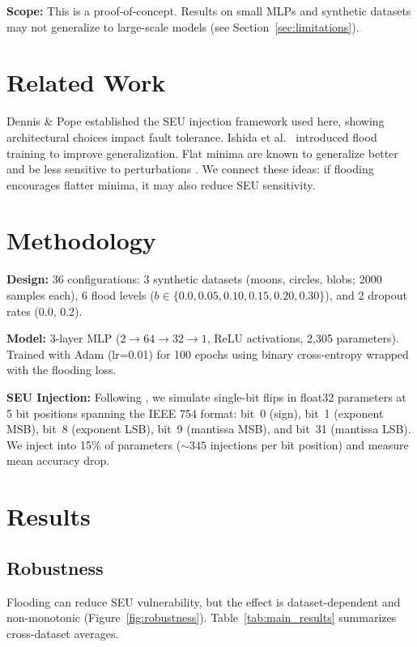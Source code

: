 \documentclass{article}
\begin{document}
\textbf{Scope:} This is a proof-of-concept. Results on small MLPs and synthetic datasets may not generalize to large-scale models (see Section~\ref{sec:limitations}).

\section{Related Work}

Dennis \& Pope \cite{dennis2025framework} established the SEU injection framework used here, showing architectural choices impact fault tolerance. Ishida et al.\ \cite{ishida2020we} introduced flood training to improve generalization. Flat minima are known to generalize better and be less sensitive to perturbations \cite{hochreiter1997flat, keskar2017large}. We connect these ideas: if flooding encourages flatter minima, it may also reduce SEU sensitivity.

\section{Methodology}

\textbf{Design:} 36 configurations: 3 synthetic datasets (moons, circles, blobs; 2000 samples each), 6 flood levels ($b \in \{0.0, 0.05, 0.10, 0.15, 0.20, 0.30\}$), and 2 dropout rates (0.0, 0.2).

\textbf{Model:} 3-layer MLP ($2 \to 64 \to 32 \to 1$, ReLU activations, 2{,}305 parameters). Trained with Adam (lr=0.01) for 100 epochs using binary cross-entropy wrapped with the flooding loss.

\textbf{SEU Injection:} Following \cite{dennis2025framework}, we simulate single-bit flips in float32 parameters at 5 bit positions spanning the IEEE 754 format: bit~0 (sign), bit~1 (exponent MSB), bit~8 (exponent LSB), bit~9 (mantissa MSB), and bit~31 (mantissa LSB). We inject into 15\% of parameters (${\sim}345$ injections per bit position) and measure mean accuracy drop.

\section{Results}

\subsection{Robustness}

Flooding can reduce SEU vulnerability, but the effect is dataset-dependent and non-monotonic (Figure~\ref{fig:robustness}). Table~\ref{tab:main_results} summarizes cross-dataset averages.
\end{document}
